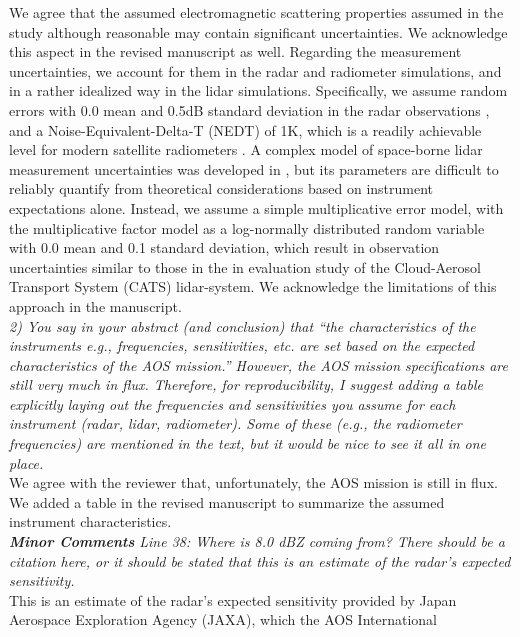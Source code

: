 \documentclass[12pt]{article}
\begin{document}
We agree that the assumed electromagnetic scattering properties assumed in the study although
reasonable may contain significant uncertainties.  We acknowledge this aspect in the revised manuscript 
as well. Regarding the measurement uncertainties, we account for them in the radar and radiometer simulations,
and in a rather idealized way in the lidar simulations.  Specifically, we assume random errors with 0.0 mean
and 0.5dB standard deviation in the radar observations \cite{takahashi2008}, and a Noise-Equivalent-Delta-T (NEDT)
of 1K, which is a readily achievable level for modern satellite radiometers \cite{draper2015}. A complex 
model of space-borne lidar measurement uncertainties was developed in \cite{liu2006}, but its parameters are
difficult to reliably quantify from theoretical considerations based on instrument expectations alone. Instead, we
assume a simple multiplicative error model, with the multiplicative factor model as a log-normally distributed random
variable with 0.0 mean and 0.1 standard deviation, which result in observation uncertainties similar to those in
the in evaluation study of the Cloud-Aerosol Transport System (CATS) lidar-system. 
We acknowledge the limitations of this approach in the manuscript.\\
\newline
\textit{2) You say in your abstract (and conclusion) that “the characteristics of 
the instruments e.g.,  frequencies, sensitivities, etc. are set based on the 
expected characteristics of the AOS mission.” However, the AOS mission 
specifications are still very much in flux. Therefore, for reproducibility, 
I suggest adding a table explicitly laying out the frequencies and 
sensitivities you assume for each instrument (radar, lidar, radiometer). 
Some of these (e.g., the radiometer frequencies) are mentioned in the text, 
but it would be nice to see it all in one place.}\\
\newline
We agree with the reviewer that, unfortunately, the AOS mission is still in flux. We added a table in the revised
manuscript to summarize the assumed instrument characteristics.\\
\newline
\textit{\textbf{Minor Comments}
Line 38: Where is 8.0 dBZ coming from? There should be a citation here, or it should be stated that this is 
an estimate of the radar’s expected sensitivity.}\\
\newline
This is an estimate of the radar’s expected sensitivity provided by Japan Aerospace Exploration Agency (JAXA), which the AOS International
\end{document}
